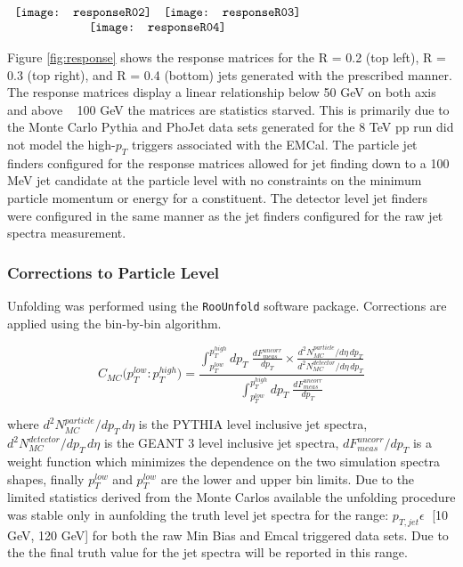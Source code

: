 \begin{figure*}[t!]
$\begin{array}{rl}
    \texttt{[image: responseR02]} &
    \texttt{[image: responseR03]}\\
    \multicolumn{2}{c}{\texttt{[image: responseR04]}}
\end{array}$
\caption[Response Matrices for R = 0.2, R=0.3, and R = 0.4 jets.]{\label{fig:response}Response Matrices for R = 0.2, R=0.3, and R = 0.4 jets.}
\end{figure*}

Figure \ref{fig:response} shows the response matrices for the R = 0.2 (top left), R = 0.3 (top right), and R = 0.4 (bottom) jets generated with the prescribed manner.  The response matrices display a linear relationship below 50 GeV on both axis and above ~ 100 GeV the matrices are statistics starved.  This is primarily due to the Monte Carlo Pythia and PhoJet data sets generated for the 8 TeV pp run did not model the high-$p_{T}$ triggers associated with the EMCal.  The particle jet finders configured for the response matrices allowed for jet finding down to a 100 MeV jet candidate at the particle level with no constraints on the minimum particle momentum or energy for a constituent.  The detector level jet finders were configured in the same manner as the jet finders configured for the raw jet spectra measurement.  

\subsubsection{Corrections to Particle Level}

Unfolding was performed using the \verb+RooUnfold+\cite{Adye:2011gm} software package.  Corrections are applied using the bin-by-bin\cite{Cowan:2002in} algorithm. 

\begin{equation}
C_{MC} \big( p_{T}^{low} : p_{T}^{high} \big) =  \frac{  \int^{p_{T}^{high}}_{p_{T}^{low}} dp_{T} \; \frac{dF^{uncorr}_{meas}}{dp_{T}} \times \frac{d^{2}N^{particle}_{MC}/d\eta \, dp_{T}}{d^{2}N^{detector}_{MC}/d\eta \, dp_{T}}  } { \int^{p_{T}^{high}}_{p_{T}^{low}} dp_{T} \; \frac{dF^{uncorr}_{meas}}{dp_{T}} }
\label{eq:binbybin}
\end{equation}

\noindent
where $d^{2}N^{particle}_{MC}/dp_{T} \, d\eta$ is the PYTHIA level inclusive jet spectra, $d^{2}N^{detector}_{MC}/dp_{T} \, d\eta$ is the GEANT 3 level inclusive jet spectra, $dF^{uncorr}_{meas} / dp_{T}$ is a weight function which minimizes the dependence on the two simulation spectra shapes, finally $p_{T}^{low}$ and $p_{T}^{low}$ are the lower and upper bin limits.  Due to the limited statistics derived from the Monte Carlos available the unfolding procedure was stable only in aunfolding the truth level jet spectra for the range: $p_{T,jet} \epsilon \;$ [10 GeV, 120 GeV] for both the raw Min Bias and Emcal triggered data sets.  Due to the  the final truth value for the jet spectra will be reported in this range.



